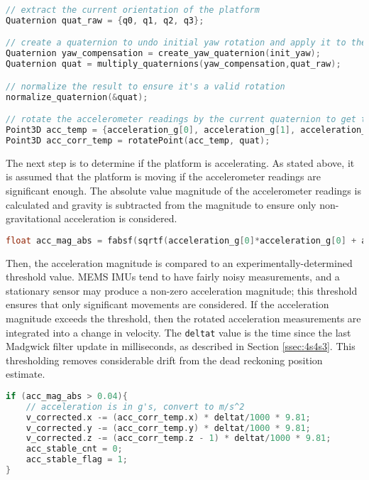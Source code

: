 \documentclass[12pt,a4paper]{report}
\begin{document}
\begin{lstlisting}[language=C++]
// extract the current orientation of the platform
Quaternion quat_raw = {q0, q1, q2, q3};

// create a quaternion to undo initial yaw rotation and apply it to the current quaternion
Quaternion yaw_compensation = create_yaw_quaternion(init_yaw);
Quaternion quat = multiply_quaternions(yaw_compensation,quat_raw);

// normalize the result to ensure it's a valid rotation
normalize_quaternion(&quat);

// rotate the accelerometer readings by the current quaternion to get the acceleration from the sensor frame to the global frame
Point3D acc_temp = {acceleration_g[0], acceleration_g[1], acceleration_g[2]};
Point3D acc_corr_temp = rotatePoint(acc_temp, quat);
\end{lstlisting}

The next step is to determine if the platform is accelerating. As stated above, it is assumed that the platform is moving if the accelerometer readings are significant enough. The absolute value magnitude of the accelerometer readings is calculated and gravity is subtracted from the magnitude to ensure only non-gravitational acceleration is considered.

\begin{lstlisting}[language=C++]
float acc_mag_abs = fabsf(sqrtf(acceleration_g[0]*acceleration_g[0] + acceleration_g[1]*acceleration_g[1] + acceleration_g[2]*acceleration_g[2]) - 1);
\end{lstlisting}

Then, the acceleration magnitude is compared to an experimentally-determined threshold value. MEMS IMUs tend to have fairly noisy measurements, and a stationary sensor may produce a non-zero acceleration magnitude; this threshold ensures that only significant movements are considered. If the acceleration magnitude exceeds the threshold, then the rotated acceleration measurements are integrated into a change in velocity. The \verb|deltat| value is the time since the last Madgwick filter update in milliseconds, as described in Section \ref{ssec:4s4s3}. This thresholding removes considerable drift from the dead reckoning position estimate.

\begin{lstlisting}[language=C++]
if (acc_mag_abs > 0.04){
	// acceleration is in g's, convert to m/s^2
	v_corrected.x -= (acc_corr_temp.x) * deltat/1000 * 9.81; 
	v_corrected.y -= (acc_corr_temp.y) * deltat/1000 * 9.81;
	v_corrected.z -= (acc_corr_temp.z - 1) * deltat/1000 * 9.81;
	acc_stable_cnt = 0;
	acc_stable_flag = 1;
}
\end{lstlisting}
\end{document}
